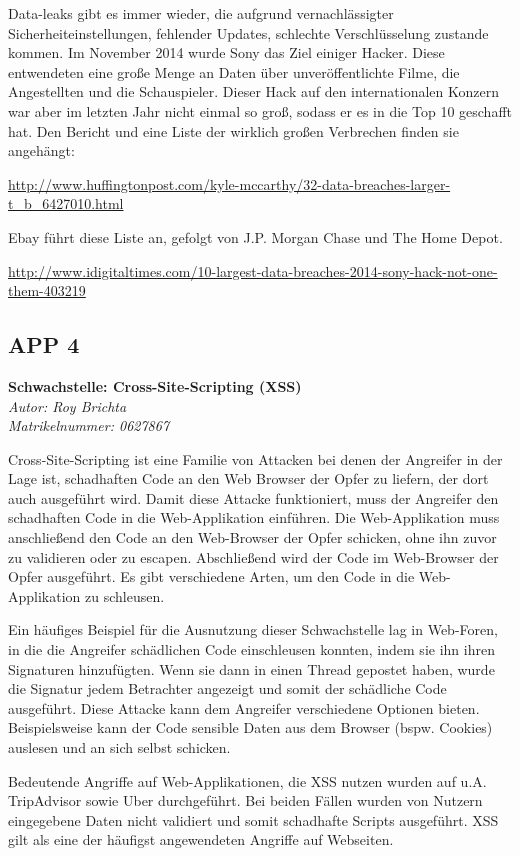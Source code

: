 \documentclass[12pt,a4paper,titlepage,oneside]{scrartcl}
\begin{document}
Data-leaks gibt es immer wieder, die aufgrund vernachlässigter Sicherheiteinstellungen, fehlender Updates, schlechte Verschlüsselung zustande kommen. Im November 2014 wurde Sony das Ziel einiger Hacker. Diese entwendeten eine große Menge an Daten über unveröffentlichte Filme, die Angestellten und die Schauspieler. Dieser Hack auf den internationalen Konzern war aber im letzten Jahr nicht einmal so groß, sodass er es in die Top 10 geschafft hat. Den Bericht und eine Liste der wirklich großen Verbrechen finden sie angehängt:

\url{http://www.huffingtonpost.com/kyle-mccarthy/32-data-breaches-larger-t_b_6427010.html}

Ebay führt diese Liste an, gefolgt von J.P. Morgan Chase und The Home Depot.

\url{http://www.idigitaltimes.com/10-largest-data-breaches-2014-sony-hack-not-one-them-403219}


\subsection{APP 4}

\textbf{{\large Schwachstelle:} Cross-Site-Scripting (XSS)}\\
\emph{Autor: Roy Brichta\\Matrikelnummer: 0627867}

Cross-Site-Scripting ist eine Familie von Attacken bei denen der Angreifer in der Lage ist, schadhaften Code an den Web Browser der Opfer zu liefern, der dort auch ausgeführt wird. Damit diese Attacke funktioniert, muss der Angreifer den schadhaften Code in die Web-Applikation einführen. Die Web-Applikation muss anschließend den Code an den Web-Browser der Opfer schicken, ohne ihn zuvor zu validieren oder zu escapen. Abschließend wird der Code im Web-Browser der Opfer ausgeführt. Es gibt verschiedene Arten, um den Code in die Web-Applikation zu schleusen. 

Ein häufiges Beispiel für die Ausnutzung dieser Schwachstelle lag in Web-Foren, in die die Angreifer schädlichen Code einschleusen konnten, indem sie ihn ihren Signaturen hinzufügten. Wenn sie dann in einen Thread gepostet haben, wurde die Signatur jedem Betrachter angezeigt und somit der schädliche Code ausgeführt. Diese Attacke kann dem Angreifer verschiedene Optionen bieten. Beispielsweise kann der Code sensible Daten aus dem Browser (bspw. Cookies) auslesen und an sich selbst schicken.

Bedeutende Angriffe auf Web-Applikationen, die XSS nutzen wurden auf u.A. TripAdvisor sowie Uber durchgeführt. Bei beiden Fällen wurden von Nutzern eingegebene Daten nicht validiert und somit schadhafte Scripts ausgeführt. XSS gilt als eine der häufigst angewendeten Angriffe auf Webseiten.
\end{document}
